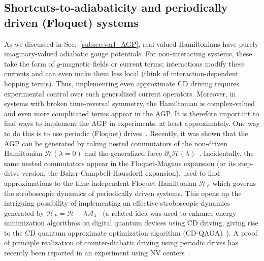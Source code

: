\subsection{Shortcuts-to-adiabaticity and periodically driven (Floquet) systems}
As we discussed in Sec.~\ref{subsec:varl_AGP}, real-valued Hamiltonians have purely imaginary-valued adiabatic gauge potentials. For non-interacting systems, these take the form of $y$-magnetic fields or current terms; interactions modify these currents and can even make them less local (think of interaction-dependent hopping terms). Thus, implementing even approximate CD driving requires experimental control over such generalized current operators. Moreover, in systems with broken time-reversal symmetry, the Hamiltonian is complex-valued and even more complicated terms appear in the AGP. It is therefore important to find ways to implement the AGP in experiments, at least approximately. 
One way to do this is to use periodic (Floquet) drives~\cite{Goldman2014_FloquetGaugeFields,Bukov_2015_general_HFE,Eckardt2017_FloquetGases_Review,Aidelsburger2018_Review,Oka2019_FloquetMaterials,Weitenberg2021_FloquetGases}. Recently, it was shown that the AGP can be generated by taking nested commutators of the non-driven Hamiltonian $\mathcal{H}(\lambda=0)$ and the generalized force $\partial_\lambda \mathcal{H}(\lambda)$~\cite{Claeys2019Floquet}. Incidentally, the same nested commutators appear in the Floquet-Magnus expansion (or its step-drive version, the Baker-Campbell-Hausdorff expansion), used to find approximations to the time-independent Floquet Hamiltonian $\mathcal{H}_F$ which governs the stroboscopic dynamics of periodically driven systems. This opens up the intriguing possibility of implementing an effective stroboscopic dynamics generated by $\mathcal{H}_F = \mathcal{H}+\dot\lambda \mathcal{A}_\lambda$~\cite{Claeys2019Floquet} (a related idea was used to enhance energy minimization algorithms on digital quantum devices using CD driving, giving rise to the CD quantum approximate optimization algorithm (CD-QAOA)~\cite{wurtz2022counterdiabaticity}). A proof of principle realization of counter-diabatic driving using periodic drives has recently been reported in an experiment using NV centers~\cite{boyers2019floquet}. 

